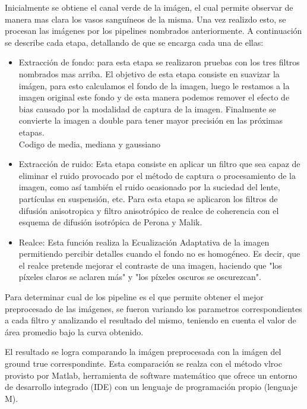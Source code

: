 Inicialmente se obtiene el canal verde de la im\'agen, el cual permite observar de manera mas clara los vasos sangu\'ineos de la misma. Una vez realizdo esto, se procesan las im\'agenes por los pipelines nombrados anteriormente.
A continuaci\'on se describe cada etapa, detallando de que se encarga cada una de ellas:

\begin{itemize}
	\item Extracci\'on de fondo: para esta etapa se realizaron pruebas con los tres filtros nombrados mas arriba. El objetivo de  esta etapa consiste en suavizar la im\'agen, para esto calculamos el fondo de la imagen, luego le restamos a la imagen original este fondo y de esta manera podemos remover el efecto de bias causado por la modalidad de captura de la imagen. Finalmente se convierte la imagen a double para tener mayor precisión en las próximas etapas.\\
Codigo de media, mediana y gaussiano\\
	\item Extracción de ruido:  Esta etapa consiste en aplicar un filtro que sea capaz de eliminar el ruido provocado por el método de captura o procesamiento de la  imagen, como así también el ruido ocasionado por la suciedad del lente, partículas en suspensión, etc. 
Para esta etapa se aplicaron los filtros de difusión anisotropica y filtro anisotrópico de realce de coherencia con el esquema de difusión isotrópica de Perona y Malik.
	\item Realce: Esta función realiza la Ecualización Adaptativa de la imagen permitiendo percibir detalles cuando el fondo no es homogéneo. Es decir, que el realce pretende mejorar el contraste de una imagen, haciendo que "los píxeles claros se aclaren más" y "los píxeles oscuros se oscurezcan". 
\end{itemize}

Para determinar cual de los pipeline es el que permite obtener el mejor preprocesado de las imágenes, se fueron variando los parametros correspondientes a cada filtro y analizando el resultado del mismo, teniendo en cuenta el valor de área promedio bajo la curva obtenido.

El resultado se logra comparando la imágen preprocesada con la imágen del ground true correspondinte. Esta comparación se realza con el método vlroc provisto por Matlab,  herramienta de software matemático que ofrece un entorno de desarrollo integrado (IDE) con un lenguaje de programación propio (lenguaje M). 

